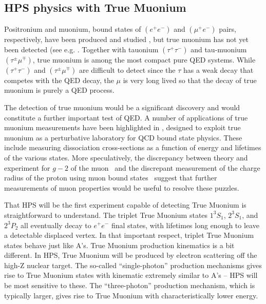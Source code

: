 \subsection{HPS physics with True Muonium}

Positronium and muonium, bound states of $(e^+ e^-)$ and $(\mu^+ e^-)$ pairs, respectively, have been
produced and studied \cite{Deutsch:1951zza,Friedman:1957mz,Hughes:1960zz}, but true muonium has not yet been 
detected (see e.g. \cite{Holvik:1986ty,ArteagaRomero:2000yh,Brodsky:2009gx,Bilenky:1969zd,Hughes:1971,Malenfant:1987tm,Karshenboim:1998we,Owen:1972,Jentschura:1997ma,Jentschura:1997tv,Karshenboim:1998am}. 
Together with tauonium $(\tau^+ \tau^-)$ and tau-muonium $(\tau^{\pm} \mu^{\mp})$, true muonium is among the most
compact pure QED systems. While $(\tau^+ \tau^-)$ and $(\tau^{\pm} \mu^{\mp})$ are difficult to detect since the $\tau$ has a
weak decay that competes with the QED decay, the $\mu$ is very long lived so that the decay of true
muonium is purely a QED process. 

The detection of true muonium would be a significant discovery and would constitute a further important test of QED.   
A number of applications of true muonium measurements have been highlighted in 
\cite{Brodsky:2009gx}, designed to exploit true muonium as a perturbative laboratory 
for QCD bound state physics. 
These include measuring dissociation cross-sections as a function of energy and lifetimes of the various states. 
More speculatively, the discrepancy between theory and experiment for $g-2$ of the muon~\cite{Bennett:2006fi} and the discrepant measurement of
the charge radius of the proton using muon bound states~\cite{Pohl:2010zza} suggest that further measurements of 
muon properties would be useful to resolve these puzzles. 

That HPS will be the first experiment capable of detecting True Muonium is straightforward to understand. 
The triplet True Muonium states $1^3S_1$, $2^3S_1$, and $2^3P_2$ all eventually decay 
to $e^+e^-$ final states, with lifetimes long enough to leave a detectable displaced vertex.
In that important respect, triplet True Muonium states behave just like A's. 
True Muonium production kinematics is a bit different. 
In HPS, True Muonium will be produced by electron scattering off the high-Z nuclear target. 
The so-called ``single-photon'' production mechanisms gives rise to True Muonium states with kinematic extremely similar to A's -- HPS will be most 
sensitive to these. The ``three-photon'' production mechanism, which is typically larger, gives rise to True Muonium with characteristically lower energy. 
 

